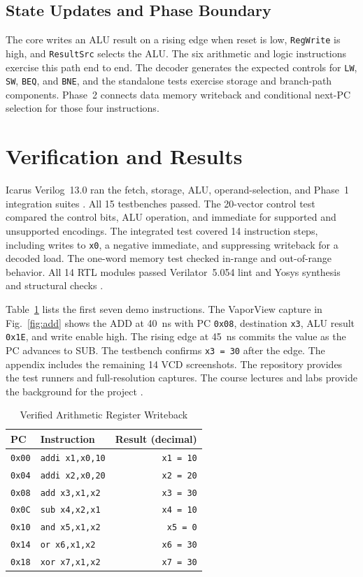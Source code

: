\documentclass[conference,letterpaper]{IEEEtran}
\newcommand{\insn}[1]{\texttt{#1}}
\begin{document}
\subsection{State Updates and Phase Boundary}
The core writes an ALU result on a rising edge when reset is low, \insn{RegWrite} is high, and \insn{ResultSrc} selects the ALU. The six arithmetic and logic instructions exercise this path end to end. The decoder generates the expected controls for \insn{LW}, \insn{SW}, \insn{BEQ}, and \insn{BNE}, and the standalone tests exercise storage and branch-path components. Phase~2 connects data memory writeback and conditional next-PC selection for those four instructions.

\section{Verification and Results}
Icarus Verilog~13.0 ran the fetch, storage, ALU, operand-selection, and Phase~1 integration suites \cite{icarus}. All 15 testbenches passed. The 20-vector control test compared the control bits, ALU operation, and immediate for supported and unsupported encodings. The integrated test covered 14 instruction steps, including writes to \insn{x0}, a negative immediate, and suppressing writeback for a decoded load. The one-word memory test checked in-range and out-of-range behavior. All 14 RTL modules passed Verilator~5.054 lint \cite{verilator} and Yosys synthesis and structural checks \cite{yosys}.

Table~\ref{tab:results} lists the first seven demo instructions. The VaporView capture in Fig.~\ref{fig:add} shows the ADD at 40~ns with PC \insn{0x08}, destination \insn{x3}, ALU result \insn{0x1E}, and write enable high. The rising edge at 45~ns commits the value as the PC advances to SUB. The testbench confirms \insn{x3 = 30} after the edge. The appendix includes the remaining 14 VCD screenshots. The repository provides the test runners and full-resolution captures. The course lectures and labs provide the background for the project \cite{mcalectures,mcalabs}.

\begin{table}[!t]
\caption{Verified Arithmetic Register Writeback}
\label{tab:results}
\centering
\begin{tabular}{@{}llr@{}}
\hline
PC & Instruction & Result (decimal) \\
\hline
\insn{0x00} & \insn{addi x1,x0,10} & \insn{x1 = 10} \\
\insn{0x04} & \insn{addi x2,x0,20} & \insn{x2 = 20} \\
\insn{0x08} & \insn{add x3,x1,x2}  & \insn{x3 = 30} \\
\insn{0x0C} & \insn{sub x4,x2,x1}  & \insn{x4 = 10} \\
\insn{0x10} & \insn{and x5,x1,x2}  & \insn{x5 = 0} \\
\insn{0x14} & \insn{or x6,x1,x2}   & \insn{x6 = 30} \\
\insn{0x18} & \insn{xor x7,x1,x2}  & \insn{x7 = 30} \\
\hline
\end{tabular}
\end{table}
\end{document}
